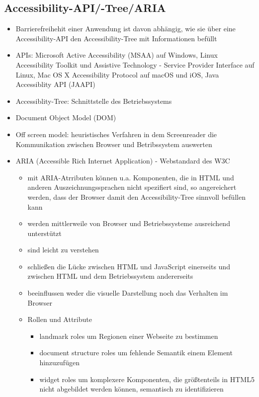 \documentclass[paper=a4, fontsize=11pt]{scrartcl} %
\numberwithin{equation}{section} %
\numberwithin{figure}{section} %
\numberwithin{table}{section} %
\begin{document}
\subsection{Accessibility-API/-Tree/ARIA}

\begin{itemize}
\item Barrierefreihehit einer Anwendung ist davon abhängig, wie sie über eine Accessibility-API den Accessibility-Tree mit Informationen befüllt
\item APIs: Microsoft Active Accessibility (MSAA) auf Windows, Linux Accessibility Toolkit und Assistive Technology - Service Provider Interface auf Linux, Mac OS X Accessibility Protocol auf macOS und iOS, Java Accessiblity API (JAAPI)
\item Accessiblity-Tree: Schnittstelle des Betriebssystems
\item Document Object Model (DOM)
\item Off screen model: heuristisches Verfahren in dem Screenreader die Kommunikation zwischen Browser und Betribssystem auswerten
\item ARIA (Accessible Rich Internet Application) - Webstandard des W3C
\begin{itemize}
\item mit ARIA-Atrributen können u.a. Komponenten, die in HTML und anderen Auszeichnungssprachen nicht spezifiert sind, so angereichert werden, dass der Browser damit den Accessibility-Tree sinnvoll befüllen kann
\item werden mittlerweile von Browser und Betriebssysteme ausreichend unterstützt
\item sind leicht zu verstehen
\item schließen die Lücke zwischen HTML und JavaScript einerseits und zwischen HTML und dem Betriebssystem andererseits
\item beeinflussen weder die visuelle Darstellung noch das Verhalten im Browser
\item Rollen und Attribute
\begin{itemize}
\item landmark roles um Regionen einer Webseite zu bestimmen
\item document structure roles um fehlende Semantik einem Element hinzuzufügen
\item widget roles um komplexere Komponenten, die größtenteils in HTML5 nicht abgebildet werden können, semantisch zu identifizieren
\end{itemize}
\end{itemize}
\end{itemize}
\end{document}
